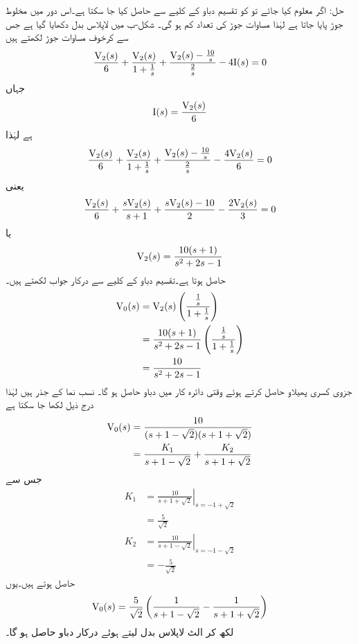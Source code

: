 حل: اگر  معلوم کیا جائے تو  کو تقسیم دباو کے کلیے سے حاصل کیا جا سکتا ہے۔اس دور میں مخلوط جوڑ پایا جاتا ہے لہٰذا مساوات جوڑ کی تعداد کم ہو گی۔ شکل-ب میں لاپلاس بدل  دکھایا گیا ہے جس سے کرخوف مساوات جوڑ لکھتے ہیں
\begin{align*}
\frac{{{\textup{V}}}_2(s)}{6}+\frac{{{\textup{V}}}_2(s)}{1+\frac{1}{s}}+\frac{{{\textup{V}}}_2(s)-\frac{10}{s}}{\frac{2}{s}}-4{{\textup{I}}}(s)=0
\end{align*}
جہاں
\begin{align*}
{\ensuremath{{\textup{I}}}}(s)=\frac{{{\textup{V}}}_2(s)}{6}
\end{align*}
ہے لہٰذا
\begin{align*}
\frac{{{\textup{V}}}_2(s)}{6}+\frac{{{\textup{V}}}_2(s)}{1+\frac{1}{s}}+\frac{{{\textup{V}}}_2(s)-\frac{10}{s}}{\frac{2}{s}}-\frac{4{{\textup{V}}}_2(s)}{6}=0
\end{align*}
یعنی
\begin{align*}
\frac{{{\textup{V}}}_2(s)}{6}+\frac{s{{\textup{V}}}_2(s)}{s+1}+\frac{s{{\textup{V}}}_2(s)-10}{2}-\frac{2{{\textup{V}}}_2(s)}{3}=0
\end{align*}
یا
\begin{align*}
{\ensuremath{{\textup{V}}}}_2(s)=\frac{10(s+1)}{s^2+2s-1}
\end{align*}
حاصل ہوتا ہے۔تقسیم دباو کے کلیے سے درکار جواب لکھتے ہیں۔
\begin{align*}
{\ensuremath{{\textup{V}}}}_0(s)&={{\textup{V}}}_2(s)\left(\frac{\frac{1}{s}}{1+\frac{1}{s}}\right)\\
&=\frac{10(s+1)}{s^2+2s-1}\left(\frac{\frac{1}{s}}{1+\frac{1}{s}}\right)\\
&=\frac{10}{s^2+2s-1}
\end{align*}
جزوی کسری پھیلاو حاصل کرتے ہوئے  وقتی دائرہ کار میں دباو حاصل ہو گا۔  نسب نما کے جذر  ہیں لہٰذا درج ذیل لکھا جا سکتا ہے
\begin{align*}
{\ensuremath{{\textup{V}}}}_0(s)&=\frac{10}{(s+1-\sqrt{2})(s+1+\sqrt{2})}\\
&=\frac{K_1}{s+1-\sqrt{2}}+\frac{K_2}{s+1+\sqrt{2}}
\end{align*}
جس سے 
\begin{align*}
K_1&=\left.\frac{10}{s+1+\sqrt{2}} \right|_{s=-1+\sqrt{2}}\\
&=\frac{5}{\sqrt{2}}\\
K_2&=\left.\frac{10}{s+1-\sqrt{2}} \right|_{s=-1-\sqrt{2}}\\
&=-\frac{5}{\sqrt{2}}
\end{align*}
حاصل ہوتے ہیں۔یوں
\begin{align*}
{\ensuremath{{\textup{V}}}}_0(s)=\frac{5}{\sqrt{2}}\left(\frac{1}{s+1-\sqrt{2}}-\frac{1}{s+1+\sqrt{2}}\right)
\end{align*}
لکھ کر الٹ لاپلاس بدل لیتے ہوئے درکار دباو حاصل ہو گا۔
